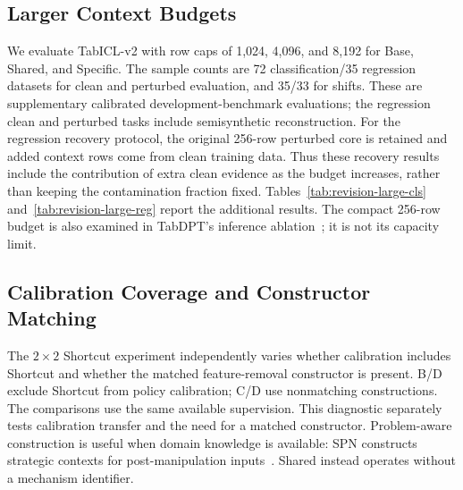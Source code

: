 








\subsection{Larger Context Budgets}
\label{app:revision-large-context}
We evaluate TabICL-v2 with row caps of 1,024, 4,096, and 8,192 for Base,
Shared, and Specific. The sample counts are 72 classification/35 regression
datasets for clean and perturbed evaluation, and 35/33 for shifts.
These are supplementary calibrated development-benchmark evaluations; the
regression clean and perturbed tasks include semisynthetic reconstruction.
For the regression recovery protocol, the original 256-row perturbed core is
retained and added context rows come from clean training data. Thus these
recovery results include the contribution of extra clean evidence as the budget
increases, rather than keeping the contamination fraction fixed.
Tables~\ref{tab:revision-large-cls} and~\ref{tab:revision-large-reg}
report the additional results. The compact 256-row budget is also examined in
TabDPT's inference ablation~\citep{ma2025tabdpt}; it is not its capacity limit.






\subsection{Calibration Coverage and Constructor Matching}
\label{app:revision-matching}
The $2\times2$ Shortcut experiment independently varies whether calibration
includes Shortcut and whether the matched feature-removal constructor is present.
B/D exclude Shortcut from policy calibration; C/D use nonmatching constructions.
The comparisons use the same available supervision. This diagnostic separately
tests calibration transfer and the need for a matched constructor.
Problem-aware construction is useful when domain knowledge is available: SPN
constructs strategic contexts for post-manipulation inputs~\citep{lv2026strategic}.
Shared instead operates without a mechanism identifier.




